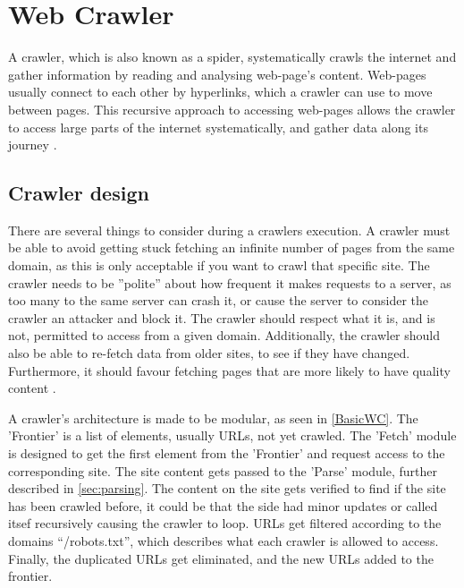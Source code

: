 \section{Web Crawler}\label{subsec:crawler}
A crawler, which is also known as a spider, systematically crawls the internet
and gather information by reading and analysing web-page's content. Web-pages
usually connect to each other by hyperlinks, which a crawler can use to move
between pages. This recursive approach to accessing web-pages allows the crawler
to access large parts of the internet systematically, and gather data along its
journey \citep[Ch20.2, P.444-445]{manning2008introduction}.

\subsection{Crawler design} 
There are several things to consider during a crawlers execution. A crawler must
be able to avoid getting stuck fetching an infinite number of pages from the
same domain, as this is only acceptable if you want to crawl that specific site.
The crawler needs to be ''polite'' about how frequent it makes requests to a
server, as too many to the same server can crash it, or cause the server to
consider the crawler an attacker and block it. The crawler should respect what
it is, and is not, permitted to access from a given domain. Additionally, the
crawler should also be able to re-fetch data from older sites, to see if they
have changed. Furthermore, it should favour fetching pages that are more
likely to have quality content \citep[Ch.20.1]{manning2008introduction}.\nl

A crawler's architecture is made to be modular, as seen in \autoref{BasicWC}.
The 'Frontier' is a list of elements, usually URLs, not yet crawled. The 'Fetch'
module is designed to get the first element from the 'Frontier' and request
access to the corresponding site. The site content gets passed to the 'Parse'
module, further described in \autoref{sec:parsing}. The content on the site gets
verified to find if the site has been crawled before, it could be that the side
had minor updates or called itsef recursively causing the crawler to loop. URLs
get filtered according to the domains ``/robots.txt'', which describes what each
crawler is allowed to access. Finally, the duplicated URLs get eliminated, and
the new URLs added to the frontier.\nl


